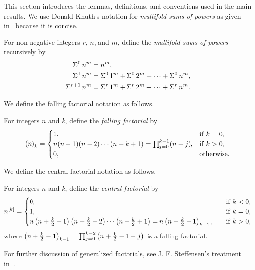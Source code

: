This section introduces the lemmas, definitions, and conventions used in the main results.
We use Donald Knuth's notation for \emph{multifold sums of powers} as given in~\cite{knuth1993johann} because it is concise.
\begin{definition} 
  \label{def:multifold-sums-of-powers-recurrence}
  For non-negative integers $r$, $n$, and $m$, define the \emph{multifold sums of powers} recursively by
  \begin{align*}
    \Sigma^{0}\,{n}^{m}   &= n^m, \\
    \Sigma^{1}\,{n}^{m}   &= \Sigma^{0}\,{1}^{m}
    + \Sigma^{0}\,{2}^{m} + \cdots + \Sigma^{0}\,{n}^{m}, \\
    \Sigma^{r+1}\,{n}^{m} &= \Sigma^{r}\,{1}^{m}
    + \Sigma^{r}\,{2}^{m} + \cdots + \Sigma^{r}\,{n}^{m}.
  \end{align*}
\end{definition}

We define the falling factorial notation as follows.
\begin{definition}  For integers $n$ and $k$, define the \emph{falling factorial} by
  \begin{align*}
    \left(n\right)_{k} =
    \begin{cases}
      1, & \mathrm{if \; } k = 0, \\
      n(n-1)(n-2)\cdots(n-k+1) = \prod_{j=0}^{k-1} (n-j), & \mathrm{if \; } k > 0, \\
      0, & \mathrm{otherwise}.
    \end{cases}
  \end{align*}
\end{definition}
We define the central factorial notation as follows.
\begin{definition}
  \label{def:central-factorials}
  For integers $n$ and $k$, define the \emph{central factorial} by
  \begin{align*}
    n^{[k]} =
    \begin{cases}
      0, \quad & \mathrm{if \; } k < 0, \\
      1, \quad & \mathrm{if \; } k = 0, \\
      n \left( n + \frac{k}{2} -1 \right)\left( n + \frac{k}{2} -2 \right)
      \cdots \left( n - \frac{k}{2} +1 \right)
      = n \left(n+\frac{k}{2}-1\right)_{k-1}, \quad & \mathrm{if \; } k>0,
    \end{cases}
  \end{align*}
  where
  $\left(n+\frac{k}{2}-1\right)_{k-1}
  = \prod_{j=0}^{k-2} \left( n+\frac{k}{2}-1 -j \right)$
  is a falling factorial.
\end{definition}
For further discussion of generalized factorials, see J. F. Steffensen's treatment in~\cite{steffensen1933definition}.

